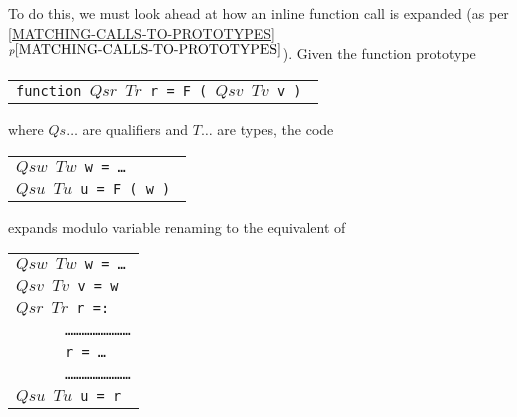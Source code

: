 \documentclass[12pt]{article}
\newcommand{\itemref}[1]{\ref{#1}$^{p\pageref{#1}}$}
\begin{document}
To do this, we must look ahead at how
an inline function call is expanded (as per
\itemref{MATCHING-CALLS-TO-PROTOTYPES}).  Given the function
prototype
\begin{center}
\begin{tabular}{l}
\tt function $Qsr$ $Tr$ r = F ( $Qsv$ $Tv$ v ) \\
\end{tabular}
\end{center}
where $Qs\ldots$ are qualifiers and $T\ldots$ are types,
the code
\begin{center}
\begin{tabular}{l}
\tt $Qsw$ $Tw$ w = \ldots \\
\tt $Qsu$ $Tu$ u = F ( w ) \\
\end{tabular}
\end{center}
expands modulo variable renaming to the equivalent of
\begin{center}
\begin{tabular}{l}
\tt $Qsw$ $Tw$ w = \ldots \\
\tt $Qsv$ $Tv$ v = w \\

\tt $Qsr$ $Tr$ r =: \\
\tt ~~~~~ \ldots\ldots\ldots\ldots\ldots\ldots\ldots\ldots \\
\tt ~~~~~ r = \ldots \\
\tt ~~~~~ \ldots\ldots\ldots\ldots\ldots\ldots\ldots\ldots \\
\tt $Qsu$ $Tu$ u = r \\
\end{tabular}
\end{center}
\end{document}
